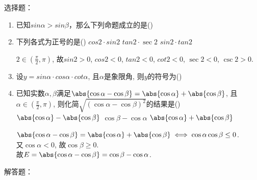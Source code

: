 选择题：
\begin{enumerate}
    \item 已知$sin\alpha > sin\beta$，那么下列命题成立的是\dotfill({})
    \item 下列各式为正号的是\dotfill()
    {$ cos2\cdot sin2$}
    {$ tan2\cdot\sec2$}
    {$ sin2\cdot tan2$}
    \begin{jieda}
    $2\in(\frac{\pi}{2},\pi)$, 故$ sin2>0$, $ cos2<0$, $ tan2<0$, $ cot2<0$, $\sec2<0$, $\csc2>0$. 
    \end{jieda}
    \item 设$y= sin\alpha\cdot cos\alpha\cdot cot\alpha$, 且$\alpha$是象限角, 则$y$的符号为\dotfill()
    \item 已知实数$\alpha,\beta$满足$\abs{\cos\alpha-\cos\beta}=\abs{\cos\alpha}+\abs{\cos\beta}$, 且$\alpha\in(\frac{\pi}{2},\pi)$, 
    则化简$\sqrt{(\cos\alpha-\cos\beta)^2}$的结果是\dotfill()
    \xx{$\cos\alpha-\cos\beta$}
    {$\abs{\cos\alpha}-\abs{\cos\beta}$}
    {$\cos\beta-\cos\alpha$}
    {$\abs{\cos\alpha}+\abs{\cos\beta}$}
    \begin{jieda}
    $\abs{\cos\alpha-\cos\beta}=\abs{\cos\alpha}+\abs{\cos\beta}\iff\cos\alpha\cos\beta\leq 0$. \\
    又$\cos\alpha<0$, 故$\cos\beta\geq 0$. \\
    故$E=\abs{\cos\alpha-\cos\beta}=\cos\beta-\cos\alpha$. 
    \end{jieda}
\end{enumerate}
解答题：
